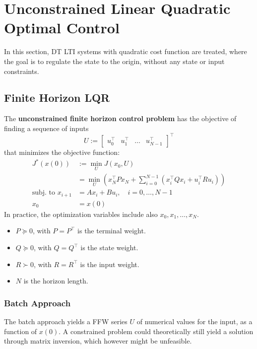 \section{Unconstrained Linear Quadratic Optimal Control}
In this section, DT LTI systems with quadratic cost function are treated, where the goal is to regulate the state to the origin, without any state or input constraints.
\subsection{Finite Horizon LQR}

The \textbf{unconstrained finite horizon control problem} has the objective of finding a sequence of inputs
\noindent\begin{equation*}
    U := \begin{bmatrix} u_0^\top & u_1^\top & \dots & u_{N-1}^\top \end{bmatrix}^\top
\end{equation*}
that minimizes the objective function:
\noindent\begin{align*}
    J^*(x(0))                & := \min_U J(x_0,U)                                                                          \\
                             & = \min_U \left( x_N^\top P x_N + \sum_{i=0}^{N-1} (x_i^\top Q x_i + u_i^\top R u_i) \right) \\
    \text{subj.\ to }x_{i+1} & = A x_i + B u_i, \quad i = 0, \dots, N-1                                                    \\
    x_0                      & = x(0)
\end{align*}
In practice, the optimization variables include also $x_0, x_1, \dots, x_N$.

\newpar{}

\begin{itemize}
    \item $P \succeq 0$, with $P = P^\top$ is the terminal weight.
    \item $Q \succeq 0$, with $Q = Q^\top$ is the state weight.
    \item $R \succ 0$, with $R = R^\top$ is the input weight.
    \item $N$ is the horizon length.
\end{itemize}

\subsubsection{Batch Approach}
The batch approach yields a FFW series $U$ of numerical values for the input, as a function of $x(0)$. A constrained problem could theoretically still yield a solution through matrix inversion, which however might be unfeasible.

